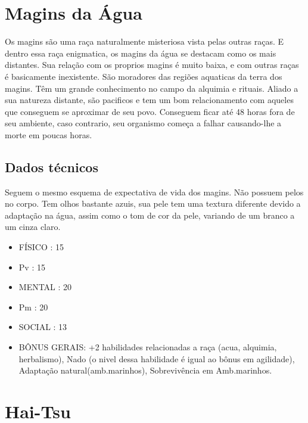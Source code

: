 \section{Magins da Água}

Os magins são uma raça naturalmente misteriosa vista pelas outras raças. E dentro essa raça enigmatica, os magins da água se destacam como os mais distantes. Sua relação com os proprios magins é muito baixa, e com outras raças é basicamente inexistente. São moradores das regiões aquaticas da terra dos magins. Têm um grande conhecimento no campo da alquimia e rituais. Aliado a sua natureza distante, são pacificos e tem um bom relacionamento com aqueles que conseguem se aproximar de seu povo. Conseguem ficar até 48 horas fora de seu ambiente, caso contrario, seu organismo começa a falhar causando-lhe a morte em poucas horas.

\subsection{Dados técnicos}


Seguem o mesmo esquema de expectativa de vida dos magins. Não possuem pelos no corpo. Tem olhos bastante azuis, sua pele tem uma textura diferente devido a adaptação na água, assim como o tom de cor da pele, variando de um branco a um cinza claro.


\begin{itemize}


\item FÍSICO : 15
\item Pv : 15

\item MENTAL : 20
\item Pm : 20

\item SOCIAL : 13

\item BÔNUS GERAIS: +2 habilidades relacionadas a raça (acua, alquimia, herbalismo), Nado (o nivel dessa habilidade é igual ao bônus em agilidade), Adaptação natural(amb.marinhos), Sobrevivência em Amb.marinhos.


\end{itemize}

\section{Hai-Tsu}

